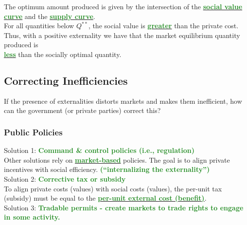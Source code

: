 \documentclass[11pt]{article}\usepackage[]{graphicx}\usepackage[]{color}
\theoremstyle{definition}
\newcommand{\ddp}[1]{{\textbf{\textcolor{ForestGreen}{#1}}}}
\newcommand{\dd}[1]{{\underline{\textbf{\textcolor{ForestGreen}{#1}}}}}
\begin{document}
	The optimum amount produced is given by the intersection of the \dd{social value curve} and the \dd{supply curve}. 
	\\
	
	For all quantities below $Q^{**}$, the social value is \dd{greater} than the private cost.
	\\
	
	Thus, with a positive externality we have that the market equilibrium quantity produced is
	\\
	\dd{less} than the socially optimal quantity. 
	
	\subsection{Correcting Inefficiencies}
	
	If the presence of externalities distorts markets and makes them inefficient, how can the government (or private parties) correct this?
	
	\subsubsection*{Public Policies}
	
	
	Solution 1: \ddp{Command \& control policies (i.e., regulation)}
	\\
	
	Other solutions rely on \dd{market-based} policies. The goal is to align private incentives with social efficiency. \ddp{(``internalizing the externality'')}
	\\
	
	Solution 2: \ddp{Corrective tax or subsidy}
	\\
	
	To align private costs (values) with social costs (values), the per-unit tax (subsidy) must be equal to the \dd{per-unit external cost (benefit)}.
	\\
	
	Solution 3: \ddp{Tradable permits - create markets to trade rights to engage in some activity.}
	\\
\end{document}
